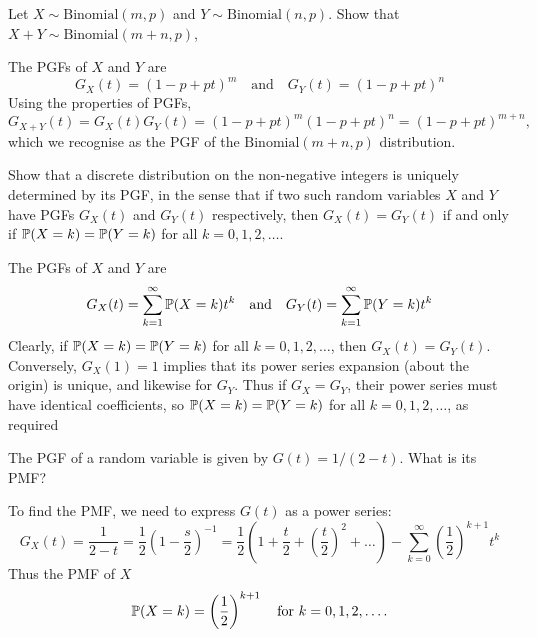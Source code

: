 \begin{exercise}
\begin{questions}
\question
Let $X\sim\text{Binomial}(m,p)$ and $Y\sim\text{Binomial}(n,p)$. Show that $X+Y\sim\text{Binomial}(m+n,p)$,
\begin{answer}
The PGFs of $X$ and $Y$ are
\[
G_X(t) = (1-p+pt)^m
\quad\text{and}\quad
G_Y(t) = (1-p+pt)^n
\]
Using the properties of PGFs,
\[
G_{X+Y}(t) = G_X(t)G_Y(t) = (1-p+pt)^m (1-p+pt)^n = (1-p+pt)^{m+n},
\]
which we recognise as the PGF of the $\text{Binomial}(m+n,p)$ distribution.
\end{answer}

\question
Show that a discrete distribution on the non-negative integers is uniquely determined by its PGF, in the sense that if two such random variables $X$ and $Y$ have PGFs $G_X(t)$ and $G_Y(t)$ respectively, then $G_X(t)=G_Y(t)$ if and only if $\mathbb{P}(X=k)=\mathbb{P}(Y=k)$ for all $k=0,1,2,\ldots$. 
\begin{answer}
The PGFs of $X$ and $Y$ are
\[
G_X(t) = \sum_{k=1}^{\infty}\mathbb{P}(X=k)t^k
\quad\text{and}\quad
G_Y(t) = \sum_{k=1}^{\infty}\mathbb{P}(Y=k)t^k
\]
Clearly, if $\mathbb{P}(X=k)=\mathbb{P}(Y=k)$ for all $k=0,1,2,\ldots$, then $G_X(t)=G_Y(t)$. Conversely, $G_X(1)=1$ implies that its power series expansion (about the origin) is unique, and likewise for $G_Y$. Thus if $G_X=G_Y$, their power series must have identical coefficients, so $\mathbb{P}(X=k)=\mathbb{P}(Y=k)$ for all $k=0,1,2,\ldots$, as required
\end{answer}

\question
The PGF of a random variable is given by $G(t)=1/(2-t)$.
What is its PMF?
\begin{answer}
To find the PMF, we need to express $G(t)$ as a power series:
\[
G_X(t) 
	= \frac{1}{2-t} 
	= \frac{1}{2}\left(1 - \frac{s}{2}\right)^{-1}
	= \frac{1}{2}\left(1 + \frac{t}{2} + \left(\frac{t}{2}\right)^2 + \ldots\right)
	- \sum_{k=0}^{\infty} \left(\frac{1}{2}\right)^{k+1} t^k
\]
Thus the PMF of $X$
\[
\mathbb{P}(X=k) = \left(\frac{1}{2}\right)^{k+1} \quad\text{for } k=0,1,2,\ldots.
\]

\end{answer}


\end{questions}
\end{exercise}
